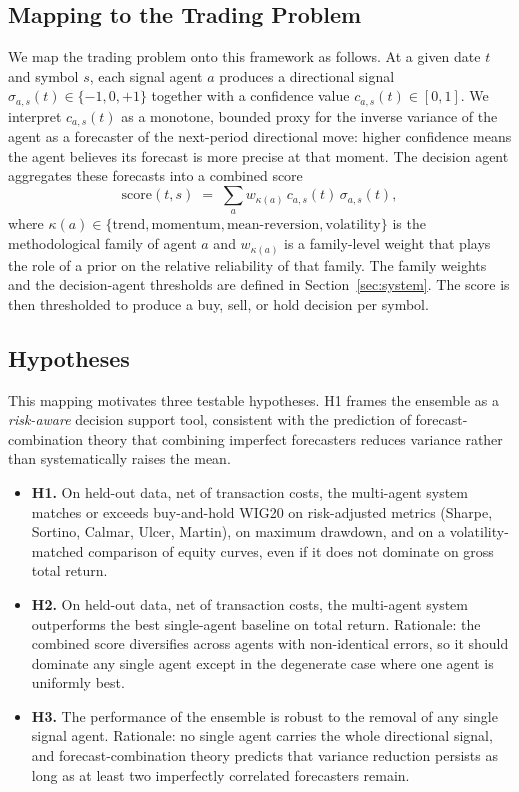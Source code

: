 \documentclass{ieeeaccess}
\begin{document}
\subsection{Mapping to the Trading Problem}

We map the trading problem onto this framework as follows. At a given date $t$ and symbol $s$, each signal agent $a$ produces a directional signal $\sigma_{a,s}(t) \in \{-1, 0, +1\}$ together with a confidence value $c_{a,s}(t) \in [0, 1]$. We interpret $c_{a,s}(t)$ as a monotone, bounded proxy for the inverse variance of the agent as a forecaster of the next-period directional move: higher confidence means the agent believes its forecast is more precise at that moment. The decision agent aggregates these forecasts into a combined score
\begin{equation}
\mathrm{score}(t, s) \;=\; \sum_{a} w_{\kappa(a)} \, c_{a,s}(t) \, \sigma_{a,s}(t),
\label{eq:score}
\end{equation}
where $\kappa(a) \in \{\text{trend}, \text{momentum}, \text{mean-reversion}, \text{volatility}\}$ is the methodological family of agent $a$ and $w_{\kappa(a)}$ is a family-level weight that plays the role of a prior on the relative reliability of that family. The family weights and the decision-agent thresholds are defined in Section~\ref{sec:system}. The score is then thresholded to produce a buy, sell, or hold decision per symbol.

\subsection{Hypotheses}

This mapping motivates three testable hypotheses. H1 frames the ensemble as a \emph{risk-aware} decision support tool, consistent with the prediction of forecast-combination theory that combining imperfect forecasters reduces variance rather than systematically raises the mean.

\begin{itemize}
\item \textbf{H1.} On held-out data, net of transaction costs, the multi-agent system matches or exceeds buy-and-hold WIG20 on risk-adjusted metrics (Sharpe, Sortino, Calmar, Ulcer, Martin), on maximum drawdown, and on a volatility-matched comparison of equity curves, even if it does not dominate on gross total return.
\item \textbf{H2.} On held-out data, net of transaction costs, the multi-agent system outperforms the best single-agent baseline on total return. Rationale: the combined score diversifies across agents with non-identical errors, so it should dominate any single agent except in the degenerate case where one agent is uniformly best.
\item \textbf{H3.} The performance of the ensemble is robust to the removal of any single signal agent. Rationale: no single agent carries the whole directional signal, and forecast-combination theory predicts that variance reduction persists as long as at least two imperfectly correlated forecasters remain.
\end{itemize}
\end{document}
